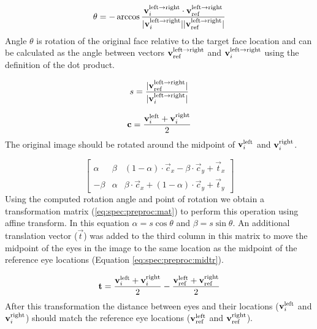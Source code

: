 \begin{equation}
    \label{eq:spec:preproc:angle}
    \theta = -\arccos{\frac{\mathbf{v}_i^{\text{left} \rightarrow \text{right}}\cdot \mathbf{v}_{\text{ref}}^{\text{left} \rightarrow \text{right}}}{|\mathbf{v}_i^{\text{left} \rightarrow \text{right}}| |\mathbf{v}_{\text{ref}}^{\text{left} \rightarrow \text{right}}|}}
\end{equation}
Angle $\theta$ is rotation of the original face relative to the target face
location and can be calculated as the angle between vectors $\mathbf{v}_{\text{ref}}^{\text{left} \rightarrow \text{right}}$ and
$\mathbf{v}_i^{\text{left} \rightarrow \text{right}}$ using the definition of the dot product.

\begin{equation}
    \label{eq:spec:preproc:scales}
    s = \frac{|\mathbf{v}_{\text{ref}}^{\text{left} \rightarrow \text{right}}|}{|\mathbf{v}_i^{\text{left} \rightarrow \text{right}}|}
\end{equation}

\begin{equation}
    \label{eq:spec:preproc:centre}
    \mathbf{c} = \frac{\mathbf{v}_i^{\text{left}} + \mathbf{v}_i^{\text{right}}}{2}
\end{equation}
The original image should be rotated around the midpoint of $\mathbf{v}_i^{\text{left}}$ and
$\mathbf{v}_i^{\text{right}}$.

\begin{equation}
    \label{eq:spec:preproc:mat}
    \begin{bmatrix}
    \alpha & \beta  & (1-\alpha)\cdot \vec{c}_x - \beta \cdot \vec{c}_y + \vec{t}_x \\
    -\beta & \alpha & \beta \cdot \vec{c}_x + (1-\alpha)\cdot \vec{c}_y + \vec{t}_y
    \end{bmatrix}
\end{equation}
Using the computed rotation angle and point of rotation we obtain a
transformation matrix (\ref{eq:spec:preproc:mat}) to perform this operation
using affine transform. In this equation $\alpha = s\cos\theta$ and $\beta =
s\sin\theta$. An additional translation vector ($\vec{t}$) was added to the
third column in this matrix to move the midpoint of the eyes in the image to
the same location as the midpoint of the reference eye locations (Equation
\ref{eq:spec:preproc:midtr}). 

\begin{equation}
    \label{eq:spec:preproc:midtr}
    \mathbf{t} = \frac{\mathbf{v}_i^{\text{left}} + \mathbf{v}_i^{\text{right}}}{2} - \frac{\mathbf{v}_{\text{ref}}^{\text{left}} + \mathbf{v}_{\text{ref}}^{\text{right}}}{2}
\end{equation}
After this transformation the distance between eyes and their locations
($\mathbf{v}_i^{\text{left}}$ and $\mathbf{v}_i^{\text{right}}$) should match the reference eye locations
($\mathbf{v}_{\text{ref}}^{\text{left}}$ and $\mathbf{v}_{\text{ref}}^{\text{right}}$).

